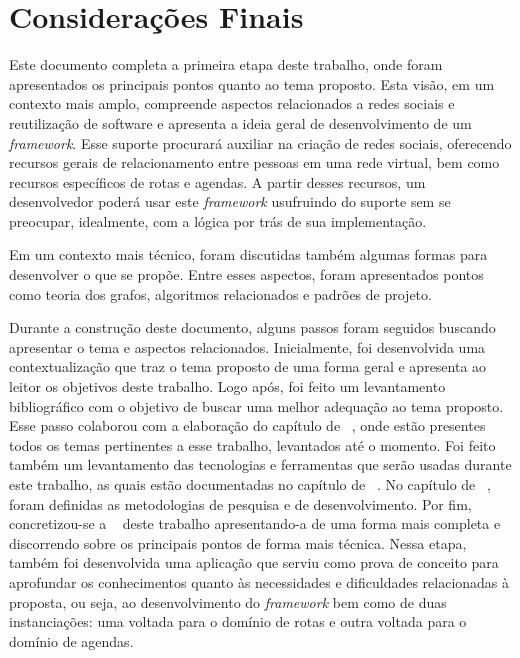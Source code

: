 \chapter{Considerações Finais}
\label{chapter:Consideracoes_Finais}

 Este documento completa a primeira etapa deste trabalho, onde foram apresentados os principais pontos quanto ao tema proposto. Esta visão, em um contexto mais amplo, compreende aspectos relacionados a redes sociais e reutilização de software e apresenta a ideia geral de desenvolvimento de um \textit{framework}. Esse suporte procurará auxiliar na criação de redes sociais, oferecendo recursos gerais de relacionamento entre pessoas em uma rede virtual, bem como recursos específicos de rotas e agendas. A partir desses recursos, um desenvolvedor poderá usar este \textit{framework} usufruindo do suporte sem se preocupar, idealmente, com a lógica por trás de sua implementação.

 Em um contexto mais técnico, foram discutidas também algumas formas para desenvolver o que se propõe. Entre esses aspectos, foram apresentados pontos como teoria dos grafos, algoritmos relacionados e padrões de projeto.

Durante a construção deste documento, alguns passos foram seguidos buscando apresentar o tema e aspectos relacionados. Inicialmente, foi desenvolvida uma contextualização que traz o tema proposto de uma forma geral e apresenta ao leitor os objetivos deste trabalho. Logo após, foi feito um levantamento bibliográfico com o objetivo de buscar uma melhor adequação ao tema proposto. Esse passo colaborou com a elaboração do capítulo de ~, onde estão presentes todos os temas pertinentes a esse trabalho, levantados até o momento. Foi feito também um levantamento das tecnologias e ferramentas que serão usadas durante este trabalho, as quais estão documentadas no capítulo de ~. No capítulo de ~, foram definidas as metodologias de pesquisa e de desenvolvimento. Por fim, concretizou-se a ~ deste trabalho apresentando-a de uma forma mais completa e discorrendo sobre os principais pontos de forma mais técnica. Nessa etapa, também foi desenvolvida uma aplicação que serviu como prova de conceito para aprofundar os conhecimentos quanto às necessidades e dificuldades relacionadas à proposta, ou seja, ao desenvolvimento do \textit{framework} bem como de duas instanciações: uma voltada para o domínio de rotas e outra voltada para o domínio de agendas.


